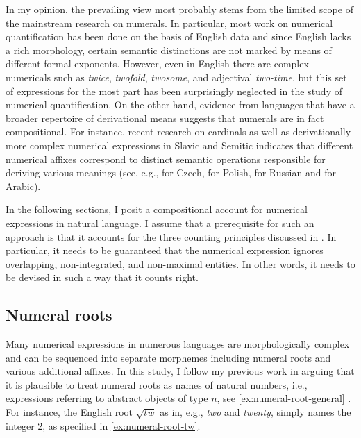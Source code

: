 	In my opinion, the prevailing view most probably stems from the limited scope of the mainstream research on numerals. In particular, most work on numerical quantification has been done on the basis of English data and since English lacks a rich morphology, certain semantic distinctions are not marked by means of different formal exponents. However, even in English there are complex numericals such as \textit{twice}, \textit{twofold}, \textit{twosome}, and adjectival \textit{two-time}, but this set of expressions for the most part has been surprisingly neglected in the study of numerical quantification. On the other hand, evidence from languages that have a broader repertoire of derivational means suggests that numerals are in fact compositional. For instance, recent research on cardinals as well as derivationally more complex numerical expressions in Slavic and Semitic indicates that different numerical affixes correspond to distinct semantic operations responsible for deriving various meanings (see, e.g., \citealt{docekal2012atoms,docekal2013numerals,docekal_wagiel2018event} for Czech, \citealt{wagiel2014boys,wagiel2015sums,wagiel-toappear-grammatical} for Polish, \citealt{khrizman2015cardinal} for Russian and \citealt{fassi_fehri2016semantic,fassi_fehri2018constructing} for Arabic). 
	
	In the following sections, I posit a compositional account for numerical expressions in natural language. I assume that a prerequisite for such an approach is that it accounts for the three counting principles discussed in  . In particular, it needs to be guaranteed that the numerical expression ignores overlapping, non-integrated, and non-maximal entities. In other words, it needs to be devised in such a way that it counts right.
	
	\subsection{Numeral roots}\label{sec:numeral-roots}
	
	Many numerical expressions in numerous languages are morphologically complex and can be sequenced into separate morphemes including numeral roots and various additional affixes. In this study, I follow my previous work in arguing that it is plausible to treat numeral roots as names of natural numbers, i.e., expressions referring to abstract objects of type $n$, see \ref{ex:numeral-root-general} \citep{wagiel2015sums,wagiel2020entities,wagiel2020several,wagiel-toappear-grammatical}. For instance, the English root $\sqrt{\textit{tw}}$ as in, e.g., \textit{two} and \textit{twenty}, simply names the integer 2, as specified in \ref{ex:numeral-root-tw}.  
	
